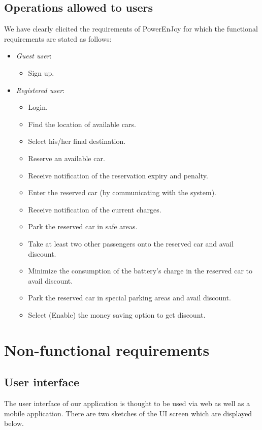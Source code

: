 \subsection{Operations allowed to users}
We have clearly elicited the requirements of PowerEnJoy for which the functional requirements are stated as follows:
\begin{itemize}
	\item \emph{Guest user}:
	\begin{itemize}
		\item Sign up.
	\end{itemize}

	\item \emph{Registered user}:
	\begin{itemize}
		\item Login.
		\item Find the location of available cars.
		\item Select his/her final destination.
		\item Reserve an available car.
		\item Receive notification of the reservation expiry and penalty.
		\item Enter the reserved car (by communicating with the system).
		\item Receive notification of the current charges.
		\item Park the reserved car in safe areas.
		\item Take at least two other passengers onto the reserved car and avail discount.
		\item Minimize the consumption of the battery's charge in the reserved car to avail discount.
		\item Park the reserved car in special parking areas and avail discount.
		\item Select (Enable) the money saving option to get discount.
	\end{itemize}
\end{itemize}

\section{Non-functional requirements}

\subsection{User interface}
The user interface of our application is thought to be used via web as well as a mobile application. There are two sketches of the UI screen which are displayed below.

